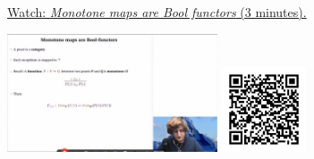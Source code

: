 
\begin{minipage}{10cm}
    \href{https://act4e-spring21.netlify.app/videos/spring2021-enrichment:monotone-maps-bool-func.html}{Watch: \emph{Monotone maps are Bool functors} (3 minutes).}
        
    \href{https://act4e-spring21.netlify.app/videos/spring2021-enrichment:monotone-maps-bool-func.html}{\includegraphics[height=3.5cm]{spring2021-enrichment:monotone-maps-bool-func/thumbnails.jpg}}
    \href{https://act4e-spring21.netlify.app/videos/spring2021-enrichment:monotone-maps-bool-func.html}{\includegraphics[height=2.5cm]{spring2021-enrichment:monotone-maps-bool-func/qrcode.png}}
\end{minipage}
